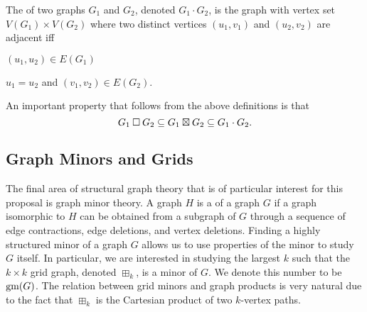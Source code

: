 \documentclass[../main.tex]{subfiles}
\begin{document}
The  of two graphs $G_1$ and $G_2$, denoted $G_1 \cdot G_2$, is the graph with vertex set $V(G_1) \times V(G_2)$ where two distinct vertices $(u_1, v_1)$ and $(u_2, v_2)$ are adjacent iff
\begin{compactitem}
	\item $(u_1, u_2) \in E(G_1)$
	\item $u_1 = u_2$ and $(v_1, v_2) \in E(G_2)$.
\end{compactitem}

An important property that follows from the above definitions is that $$G_1\mathbin{\Box} G_2 \subseteq G_1\boxtimes G_2 \subseteq G_1 \cdot G_2.$$


\subsection{Graph Minors and Grids}
The final area of structural graph theory that is of particular interest for this proposal is graph minor theory. A graph $H$ is a  of a graph $G$ if a graph isomorphic to $H$ can be obtained from a subgraph of $G$ through a sequence of edge contractions, edge deletions, and vertex deletions. Finding a highly structured minor of a graph $G$ allows us to use properties of the minor to study $G$ itself. In particular, we are interested in studying the largest $k$ such that the $k\times k$ grid graph, denoted $\boxplus_k$, is a minor of $G$. We denote this number to be $\operatorname{gm}(G)$. The relation between grid minors and graph products is very natural due to the fact that $\boxplus_k$ is the Cartesian product of two $k$-vertex paths.

	
	
\end{document}
